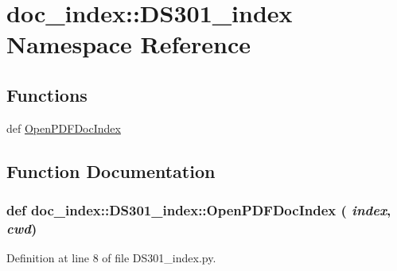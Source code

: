 \hypertarget{namespacedoc__index_1_1DS301__index}{
\section{doc\_\-index::DS301\_\-index Namespace Reference}
\label{namespacedoc__index_1_1DS301__index}
}


\subsection*{Functions}
\begin{CompactItemize}
\item 
def \hyperlink{namespacedoc__index_1_1DS301__index_07b9112f2b3d3e81b1edf3c81b6c4807}{Open\-PDFDoc\-Index}
\end{CompactItemize}


\subsection{Function Documentation}
\hypertarget{namespacedoc__index_1_1DS301__index_07b9112f2b3d3e81b1edf3c81b6c4807}{
\subsubsection[OpenPDFDocIndex]{\setlength{\rightskip}{0pt plus 5cm}def doc\_\-index::DS301\_\-index::Open\-PDFDoc\-Index ( {\em index},  {\em cwd})}}
\label{namespacedoc__index_1_1DS301__index_07b9112f2b3d3e81b1edf3c81b6c4807}




Definition at line 8 of file DS301\_\-index.py.